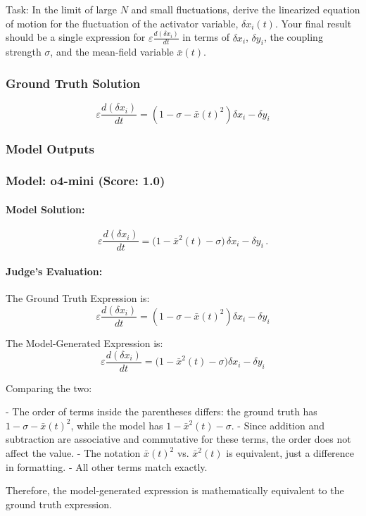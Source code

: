 \documentclass[10pt]{article}
\begin{document}
Task:
In the limit of large $N$ and small fluctuations, derive the linearized equation of motion for the fluctuation of the activator variable, $\delta x_i(t)$. Your final result should be a single expression for $\varepsilon \frac{d(\delta x_i)}{dt}$ in terms of $\delta x_i$, $\delta y_i$, the coupling strength $\sigma$, and the mean-field variable $\bar{x}(t)$.

\subsubsection*{Ground Truth Solution}
\[ \boxed{\varepsilon\frac{d(\delta x_i)}{dt} = (1 - \sigma - \bar{x}(t)^2)\delta x_i - \delta y_i} \]

\subsubsection*{Model Outputs}
\subsubsection*{Model: o4-mini (Score: 1.0)}
\paragraph*{Model Solution:}
\[ \varepsilon\frac{d(\delta x_i)}{dt}=\bigl(1-\bar x^2(t)-\sigma\bigr)\,\delta x_i-\delta y_i\,. \]

\paragraph*{Judge's Evaluation:}

The Ground Truth Expression is:
\[
\varepsilon \frac{d(\delta x_i)}{dt} = (1 - \sigma - \bar{x}(t)^2) \delta x_i - \delta y_i
\]

The Model-Generated Expression is:
\[
\varepsilon \frac{d(\delta x_i)}{dt} = \bigl(1 - \bar{x}^2(t) - \sigma \bigr) \delta x_i - \delta y_i
\]

Comparing the two:

- The order of terms inside the parentheses differs: the ground truth has \(1 - \sigma - \bar{x}(t)^2\), while the model has \(1 - \bar{x}^2(t) - \sigma\).
- Since addition and subtraction are associative and commutative for these terms, the order does not affect the value.
- The notation \(\bar{x}(t)^2\) vs. \(\bar{x}^2(t)\) is equivalent, just a difference in formatting.
- All other terms match exactly.

Therefore, the model-generated expression is mathematically equivalent to the ground truth expression.
\end{document}
